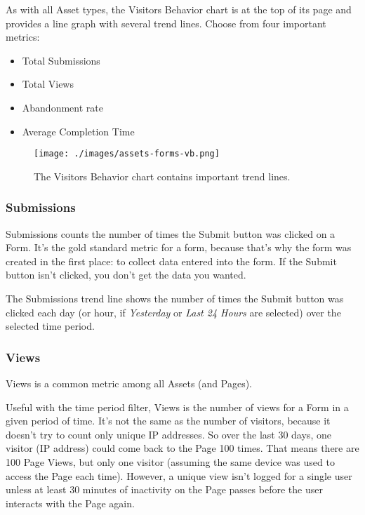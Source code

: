 As with all Asset types, the Visitors Behavior chart is at the top of
its page and provides a line graph with several trend lines. Choose from
four important metrics:

\begin{itemize}
\tightlist
\item
  Total Submissions
\item
  Total Views
\item
  Abandonment rate
\item
  Average Completion Time
\end{itemize}

\begin{figure}
\centering
\texttt{[image: ./images/assets-forms-vb.png]}
\caption{The Visitors Behavior chart contains important trend lines.}
\end{figure}

\subsubsection{Submissions}\label{submissions}

Submissions counts the number of times the Submit button was clicked on
a Form. It's the gold standard metric for a form, because that's why the
form was created in the first place: to collect data entered into the
form. If the Submit button isn't clicked, you don't get the data you
wanted.

The Submissions trend line shows the number of times the Submit button
was clicked each day (or hour, if \emph{Yesterday} or \emph{Last 24
Hours} are selected) over the selected time period.

\subsubsection{Views}\label{views}

Views is a common metric among all Assets (and Pages).

Useful with the time period filter, Views is the number of views for a
Form in a given period of time. It's not the same as the number of
visitors, because it doesn't try to count only unique IP addresses. So
over the last 30 days, one visitor (IP address) could come back to the
Page 100 times. That means there are 100 Page Views, but only one
visitor (assuming the same device was used to access the Page each
time). However, a unique view isn't logged for a single user unless at
least 30 minutes of inactivity on the Page passes before the user
interacts with the Page again.

